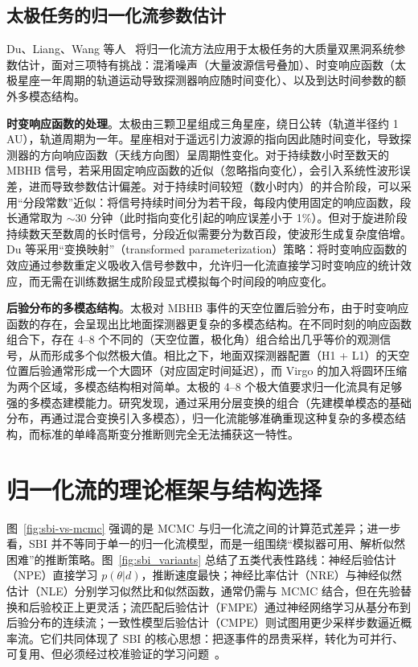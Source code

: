 \subsection{太极任务的归一化流参数估计}

Du、Liang、Wang 等人~\cite{du2024normflow} 将归一化流方法应用于太极任务的大质量双黑洞系统参数估计，面对三项特有挑战：混淆噪声（大量波源信号叠加）、时变响应函数（太极星座一年周期的轨道运动导致探测器响应随时间变化）、以及到达时间参数的额外多模态结构。

\textbf{时变响应函数的处理}。太极由三颗卫星组成三角星座，绕日公转（轨道半径约 1 AU），轨道周期为一年。星座相对于遥远引力波源的指向因此随时间变化，导致探测器的方向响应函数（天线方向图）呈周期性变化。对于持续数小时至数天的 MBHB 信号，若采用固定响应函数的近似（忽略指向变化），会引入系统性波形误差，进而导致参数估计偏差。对于持续时间较短（数小时内）的并合阶段，可以采用“分段常数”近似：将信号持续时间分为若干段，每段内使用固定的响应函数，段长通常取为 $\sim$30 分钟（此时指向变化引起的响应误差小于 1\%）。但对于旋进阶段持续数天至数周的长时信号，分段近似需要分为数百段，使波形生成复杂度倍增。Du 等采用“变换映射”（transformed parameterization）策略：将时变响应函数的效应通过参数重定义吸收入信号参数中，允许归一化流直接学习时变响应的统计效应，而无需在训练数据生成阶段显式模拟每个时间段的响应变化。

\textbf{后验分布的多模态结构}。太极对 MBHB 事件的天空位置后验分布，由于时变响应函数的存在，会呈现出比地面探测器更复杂的多模态结构。在不同时刻的响应函数组合下，存在 4--8 个不同的（天空位置，极化角）组合给出几乎等价的观测信号，从而形成多个似然极大值。相比之下，地面双探测器配置（H1 + L1）的天空位置后验通常形成一个大圆环（对应固定时间延迟），而 Virgo 的加入将圆环压缩为两个区域，多模态结构相对简单。太极的 4--8 个极大值要求归一化流具有足够强的多模态建模能力。研究发现，通过采用分层变换的组合（先建模单模态的基础分布，再通过混合变换引入多模态），归一化流能够准确重现这种复杂的多模态结构，而标准的单峰高斯变分推断则完全无法捕获这一特性。

\section{归一化流的理论框架与结构选择}

图~\ref{fig:sbi-vs-mcmc} 强调的是 MCMC 与归一化流之间的计算范式差异；进一步看，SBI 并不等同于单一的归一化流模型，而是一组围绕“模拟器可用、解析似然困难”的推断策略。图~\ref{fig:sbi_variants} 总结了五类代表性路线：神经后验估计（NPE）直接学习 $p(\theta|d)$，推断速度最快；神经比率估计（NRE）与神经似然估计（NLE）分别学习似然比和似然函数，通常仍需与 MCMC 结合，但在先验替换和后验校正上更灵活；流匹配后验估计（FMPE）通过神经网络学习从基分布到后验分布的连续流；一致性模型后验估计（CMPE）则试图用更少采样步数逼近概率流。它们共同体现了 SBI 的核心思想：把逐事件的昂贵采样，转化为可并行、可复用、但必须经过校准验证的学习问题~\cite{liang2026sbireview}。

